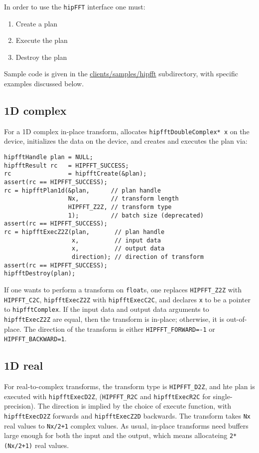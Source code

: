 \documentclass[12pt]{article}
\renewcommand{\(}{\left(}
\renewcommand{\)}{\right)}
\begin{document}
In order to use the \texttt{hipFFT} interface one must:
\begin{enumerate}
\item Create a plan
\item Execute the plan
\item Destroy the plan
\end{enumerate}
Sample code is given in the \url{clients/samples/hipfft} subdirectory,
with specific examples discussed below.

\subsection{1D complex}
For a 1D complex in-place transform, allocates
\lstinline{hipfftDoubleComplex* x} on the device, initializes the data
on the device, and creates and executes the plan via:
\begin{lstlisting}
hipfftHandle plan = NULL;
hipfftResult rc   = HIPFFT_SUCCESS;
rc                = hipfftCreate(&plan);
assert(rc == HIPFFT_SUCCESS);
rc = hipfftPlan1d(&plan,      // plan handle
                  Nx,         // transform length
                  HIPFFT_Z2Z, // transform type 
                  1);         // batch size (deprecated)
assert(rc == HIPFFT_SUCCESS);
rc = hipfftExecZ2Z(plan,       // plan handle
                   x,          // input data
                   x,          // output data
                   direction); // direction of transform
assert(rc == HIPFFT_SUCCESS);
hipfftDestroy(plan);
\end{lstlisting}
If one wants to perform a transform on \lstinline{float}s, one
replaces \lstinline{HIPFFT_Z2Z} with \lstinline{HIPFFT_C2C},
\lstinline{hipfftExecZ2Z} with \lstinline{hipfftExecC2C}, and declares
\lstinline{x} to be a pointer to \lstinline{hipfftComplex}.  If the
input data and output data arguments to \lstinline{hipfftExecZ2Z} are
equal, then the transform is in-place; otherwise, it is out-of-place.
The direction of the transform is either \lstinline{HIPFFT_FORWARD=-1}
or \lstinline{HIPFFT_BACKWARD=1}.

\subsection{1D real}

For real-to-complex transforms, the transform type is
\lstinline{HIPFFT_D2Z}, and hte plan is executed with
\lstinline{hipfftExecD2Z}, (\lstinline{HIPFFT_R2C} and
\lstinline{hipfftExecR2C} for single-precision).  The direction is
implied by the choice of execute function, with
\lstinline{hipfftExecD2Z} forwards and \lstinline{hipfftExecZ2D}
backwards.  The transform takes \lstinline{Nx} real values to
\lstinline{Nx/2+1} complex values.  As usual, in-place transforms need
buffers large enough for both the input and the output, which means
allocateing \lstinline{2*(Nx/2+1)} real values.
\end{document}
